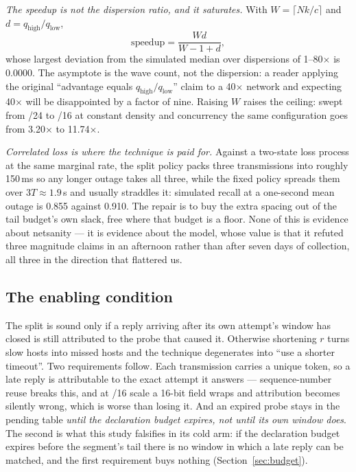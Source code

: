 \documentclass[conference]{IEEEtran}
\newcommand{\netsanity}{\textsf{netsanity}}
\newcommand{\qhigh}{q_{\mathrm{high}}}
\newcommand{\qlow}{q_{\mathrm{low}}}
\begin{document}
\emph{The speedup is not the dispersion ratio, and it saturates.} With
$W=\lceil Nk/c\rceil$ and $d=\qhigh/\qlow$,
\begin{equation}
\mathrm{speedup}=\frac{Wd}{W-1+d},
\label{eq:speedup}
\end{equation}
whose largest deviation from the simulated median over dispersions of
1--80$\times$ is $0.0000$. The asymptote is the wave count, not the dispersion:
a reader applying the original ``advantage equals $\qhigh/\qlow$'' claim to a
40$\times$ network and expecting 40$\times$ will be disappointed by a factor of
nine. Raising $W$ raises the ceiling: swept from /24 to /16 at constant density and
concurrency the same configuration goes from 3.20$\times$ to 11.74$\times$.

\emph{Correlated loss is where the technique is paid for.} Against a two-state
loss process at the same marginal rate, the split policy packs three
transmissions into roughly 150\,ms so any longer outage takes all three, while
the fixed policy spreads them over $3T\approx1.9$\,s and usually straddles it:
simulated recall at a one-second mean outage is 0.855 against 0.910. The repair
is to buy the extra spacing out of the tail budget's own slack, free where that
budget is a floor. None of this is evidence about \netsanity{} --- it is
evidence about the model, whose value is that it refuted three magnitude claims
in an afternoon rather than after seven days of collection, all three in the
direction that flattered us.

\subsection{The enabling condition}
\label{sec:enabling}
The split is sound only if a reply arriving after its own attempt's window has
closed is still attributed to the probe that caused it. Otherwise shortening
$r$ turns slow hosts into missed hosts and the technique degenerates into ``use
a shorter timeout''. Two requirements follow. Each transmission carries a
unique token, so a late reply is attributable to the exact attempt it answers
--- sequence-number reuse breaks this, and at /16 scale a 16-bit field wraps
and attribution becomes silently wrong, which is worse than losing it. And an
expired probe stays in the pending table \emph{until the declaration budget
expires, not until its own window does}. The second is what this study
falsifies in its cold arm: if the declaration budget expires before the
segment's tail there is no window in which a late reply can be matched, and the
first requirement buys nothing (Section~\ref{sec:budget}).
\end{document}
